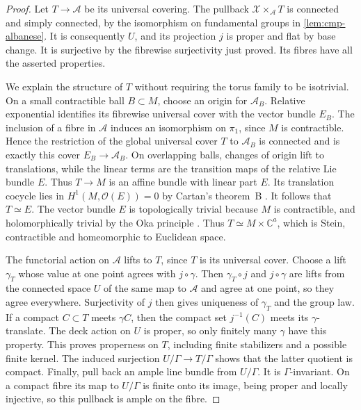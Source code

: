 \begin{proof}
Let $T\to\mathcal{A}$ be its universal covering.  The pullback $\mathcal{X}\times_{\mathcal{A}}T$ is connected and simply connected, by the isomorphism on fundamental groups in \cref{lem:cmp-albanese}. It is consequently $U$, and its projection $j$ is proper and flat by base change.  It is surjective by the fibrewise surjectivity just proved.  Its fibres have all the asserted properties.

We explain the structure of $T$ without requiring the torus family to be isotrivial.  On a small contractible ball $B\subset M$, choose an origin for $\mathcal{A}_B$.  Relative exponential identifies its fibrewise universal cover with the vector bundle $E_B$.  The inclusion of a fibre in $\mathcal{A}$ induces an isomorphism on $\pi_1$, since $M$ is contractible.  Hence the restriction of the global universal cover $T$ to $\mathcal{A}_B$ is connected and is exactly this cover $E_B\to\mathcal{A}_B$.  On overlapping balls, changes of origin lift to translations, while the linear terms are the transition maps of the relative Lie bundle $E$.  Thus $T\to M$ is an affine bundle with linear part $E$.  Its translation cocycle lies in $H^1(M,\mathcal{O}(E))=0$ by Cartan's theorem~B \cite[Expos\'e~18, \S4]{Cartan1952}.  It follows that $T\simeq E$.  The vector bundle $E$ is topologically trivial because $M$ is contractible, and holomorphically trivial by the Oka principle \cite{Grauert1958,ForstnericPrezelj2000}. Thus $T\simeq M\times\mathbb{C}^a$, which is Stein, contractible and homeomorphic to Euclidean space.

\enlargethispage{\baselineskip} The functorial action on $\mathcal{A}$ lifts to $T$, since $T$ is its universal cover.  Choose a lift $\gamma_T$ whose value at one point agrees with $j\circ\gamma$.  Then $\gamma_T\circ j$ and $j\circ\gamma$ are lifts from the connected space $U$ of the same map to $\mathcal{A}$ and agree at one point, so they agree everywhere. Surjectivity of $j$ then gives uniqueness of $\gamma_T$ and the group law.  If a compact $C\subset T$ meets $\gamma C$, then the compact set $j^{-1}(C)$ meets its $\gamma$-translate.  The deck action on $U$ is proper, so only finitely many $\gamma$ have this property.  This proves properness on $T$, including finite stabilizers and a possible finite kernel. The induced surjection $U/\Gamma\to T/\Gamma$ shows that the latter quotient is compact.  Finally, pull back an ample line bundle from $U/\Gamma$.  It is $\Gamma$-invariant.  On a compact fibre its map to $U/\Gamma$ is finite onto its image, being proper and locally injective, so this pullback is ample on the fibre.
\end{proof}

